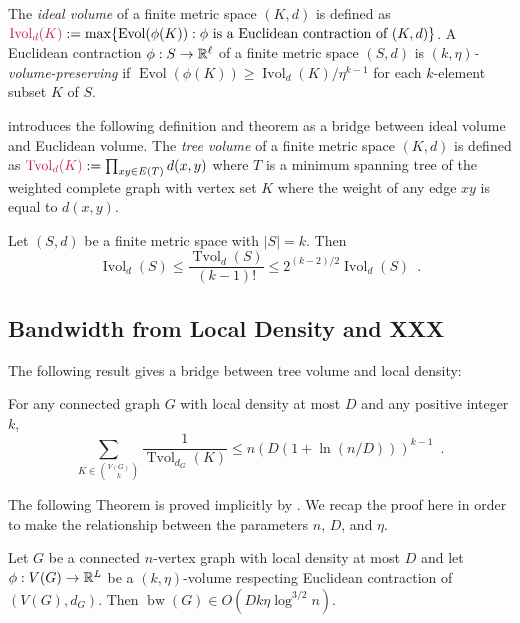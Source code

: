 \documentclass{patmorin}
\makeatletter
\newcommand{\defin}[1]{\emph{\textcolor{brightmaroon}{#1}}}
\def\mathcolor#1#{\@mathcolor{#1}}
\def\@mathcolor#1#2#3{%
  \protect\leavevmode
  \begingroup
    \color#1{#2}#3%
  \endgroup
}
\newcommand{\mathdefin}[1]{\mathcolor{brightmaroon}{#1}}
\DeclareMathOperator{\bw}{bw}
\DeclareMathOperator{\evol}{Evol}
\DeclareMathOperator{\ivol}{Ivol}
\DeclareMathOperator{\tvol}{Tvol}
\makeatother
\begin{document}
The \defin{ideal volume} of a finite metric space $(K,d)$ is defined as $\mathdefin{\ivol_d(K)}:=\max\{\evol(\phi(K)):\text{$\phi$ is a Euclidean contraction of $(K,d)$}\}$.  A Euclidean contraction $\phi:S\to\mathbb{R}^{\ell}$ of a finite metric space $(S,d)$ is \defin{$(k,\eta)$-volume-preserving} if $\evol(\phi(K))\ge \ivol_d(K)/\eta^{k-1}$ for each $k$-element subset $K$ of $S$.

\citet{feige:approximating} introduces the following definition and theorem as a bridge between ideal volume and Euclidean volume. The \defin{tree volume} of a finite metric space $(K,d)$ is defined as $\mathdefin{\tvol_d(K)}:=\prod_{xy\in E(T)} d(x,y)$ where $T$ is a minimum spanning tree of the weighted complete graph with vertex set $K$ where the weight of any edge $xy$ is equal to $d(x,y)$.

\begin{lem}
  Let $(S,d)$ be a finite metric space with $|S|=k$.  Then
  \[
    \ivol_{d}(S) \le \frac{\tvol_d(S)}{(k-1)!} \le 2^{(k-2)/2}\ivol_d(S) \enspace .
  \]
\end{lem}

\subsection{Bandwidth from Local Density and XXX}

The following result gives a bridge between tree volume and local density:

\begin{lem}\label{reciprocal_sum}
  For any connected graph $G$ with local density at most $D$ and any positive integer $k$,
  \[  \sum_{K\in \binom{V(G)}{k}}\frac{1}{\tvol_{d_G}(K)}\le n(D(1+\ln(n/D)))^{k-1} \enspace .
  \]
\end{lem}





The following Theorem is proved implicitly by \citet{feige:approximating}. We recap the proof here in order to make the relationship between the parameters $n$, $D$, and $\eta$.

\begin{thm}
  Let $G$ be a connected $n$-vertex graph with local density at most $D$ and let $\phi:V(G)\to \mathbb{R}^L$ be a $(k,\eta)$-volume respecting Euclidean contraction of $(V(G),d_G)$.  Then $\bw(G) \in O(Dk\eta\log^{3/2} n)$.
\end{thm}
\end{document}
